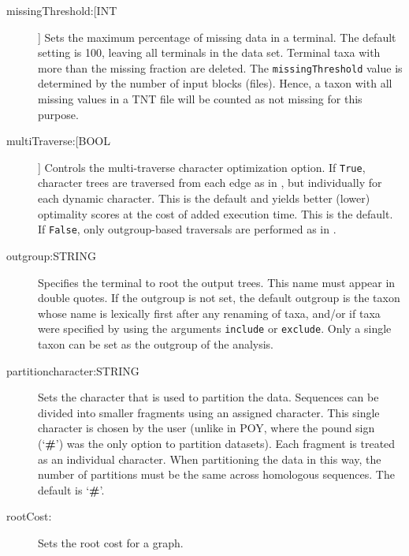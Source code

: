 \begin{description}
		\item[missingThreshold:[INT]] Sets the maximum percentage of missing data in a 
		terminal. The default setting is 100, leaving all terminals in the data set. Terminal taxa
		with more than the missing fraction are deleted.  The \texttt{missingThreshold} value is 
		determined by the number of input blocks (files). Hence, a taxon with all missing values 
		in a TNT file will be counted as not missing for this purpose.   
		
		
		\item[multiTraverse:[BOOL]] Controls the multi-traverse character optimization 
		option. If \texttt{True}, character trees are traversed from each edge as in 
		\citep{VaronandWheeler2012,VaronandWheeler2013, POY4, POY5}, but 
		individually for each dynamic character. This is the default and yields better 
		(lower) optimality scores at the cost of added execution time. This is the default.
		If \texttt{False}, only outgroup-based traversals are performed as in 
		\citep{Wheeler1996, POY2, POY3}. 
					
		\item[outgroup:STRING] Specifies the terminal to root the output trees. 
		This name must appear in double quotes. If the outgroup is not set, the 
		default outgroup is the taxon whose name is lexically first after any renaming 
		of taxa, and/or if taxa were specified by using the arguments \texttt{include} 
		or \texttt{exclude}. Only a single taxon can be set as the outgroup of the analysis. 
					
		\item[partitioncharacter:STRING] Sets the character that is used to partition the 
		data. Sequences can be divided into smaller fragments using an assigned character. 
		This single character is chosen by the user (unlike in POY, where the pound sign 
		(`\textbf{\#}') was the only option to partition datasets). Each fragment is treated as an 
		individual character. When partitioning the data in this way, the number of partitions 
		must be the same across homologous sequences. The default is `\textbf{\#}'.


		\item[rootCost:] Sets the root cost for a graph. 	
				

\end{description}
